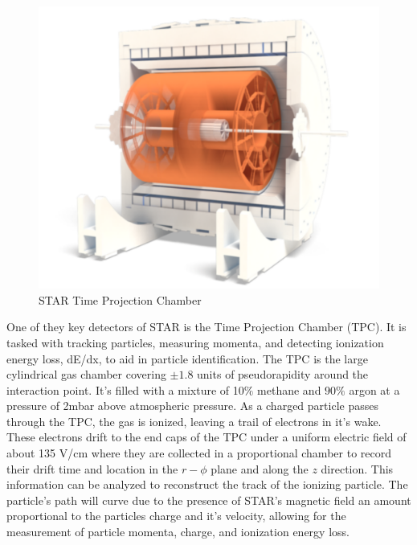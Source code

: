 \documentclass[abstract = on,listof=totoc, bibliography=totoc]{scrreprt}
\begin{document}
\begin{figure}[h!]
\begin{center}
\includegraphics[width = .7\textwidth]{TPCfull}
\caption[STAR Time Projection Chamber]{STAR Time Projection Chamber}
\label{fig:tpcSchem}
\end{center}
\end{figure}


One of they key detectors of STAR is the Time Projection Chamber (TPC). It is tasked with tracking particles, measuring momenta, and detecting ionization energy loss, dE/dx, to aid in particle identification. The TPC is the large cylindrical gas chamber covering $\pm1.8$ units of pseudorapidity around the interaction point. It's filled with a mixture of 10$\%$ methane and $90\%$ argon at a pressure of 2mbar above atmospheric pressure. As a charged particle passes through the TPC, the gas is ionized, leaving a trail of electrons in it's wake. These electrons drift to the end caps of the TPC under a uniform electric field of about 135 V/cm where they are collected in a proportional chamber to record their drift time and location in the $r-\phi$ plane and along the $z$ direction. This information can be analyzed to reconstruct the track of the ionizing particle. The particle's path will curve due to the presence of STAR's magnetic field an amount proportional to the particles charge and it's velocity, allowing for the measurement of particle momenta, charge, and ionization energy loss.



\end{document}
